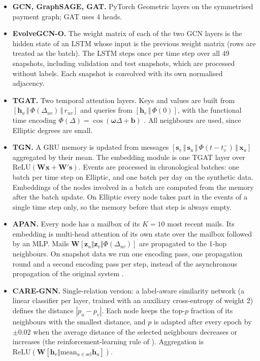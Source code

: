 \begin{itemize}
\item \textbf{GCN, GraphSAGE, GAT.} PyTorch Geometric layers on the symmetrised payment graph; GAT uses 4 heads.
\item \textbf{EvolveGCN-O.} The weight matrix of each of the two GCN layers is the hidden state of an LSTM whose input is the previous weight matrix (rows are treated as the batch). The LSTM steps once per time step over all 49 snapshots, including validation and test snapshots, which are processed without labels. Each snapshot is convolved with its own normalised adjacency.
\item \textbf{TGAT.} Two temporal attention layers. Keys and values are built from $[\mathbf{h}_u\,\Vert\,\Phi(\Delta_{uv})\,\Vert\,r_{uv}]$ and queries from $[\mathbf{h}_v\,\Vert\,\Phi(0)]$, with the functional time encoding $\Phi(\Delta)=\cos(\boldsymbol{\omega}\Delta+\mathbf{b})$ \citep{xu2020tgat}. All neighbours are used, since Elliptic degrees are small.
\item \textbf{TGN.} A GRU memory is updated from messages $[\mathbf{s}_v\,\Vert\,\mathbf{s}_u\,\Vert\,\Phi(t-t^{-}_v)\,\Vert\,\mathbf{x}_u]$ aggregated by their mean. The embedding module is one TGAT layer over $\mathrm{ReLU}(\mathbf{W}\mathbf{x}+\mathbf{W}'\mathbf{s})$. Events are processed in chronological batches: one batch per time step on Elliptic, and one batch per day on the synthetic data. Embeddings of the nodes involved in a batch are computed from the memory after the batch update. On Elliptic every node takes part in the events of a single time step only, so the memory before that step is always empty.
\item \textbf{APAN.} Every node has a mailbox of its $K=10$ most recent mails. Its embedding is multi-head attention of its own state over the mailbox followed by an MLP. Mails $\mathbf{W}[\mathbf{z}_u\Vert\mathbf{z}_v\Vert\Phi(\Delta_{uv})]$ are propagated to the 1-hop neighbours. On snapshot data we run one encoding pass, one propagation round and a second encoding pass per step, instead of the asynchronous propagation of the original system \citep{wang2021apan}.
\item \textbf{CARE-GNN.} Single-relation version: a label-aware similarity network (a linear classifier per layer, trained with an auxiliary cross-entropy of weight 2) defines the distance $|p_u-p_v|$. Each node keeps the top-$p$ fraction of its neighbours with the smallest distance, and $p$ is adapted after every epoch by $\pm0.02$ when the average distance of the selected neighbours decreases or increases (the reinforcement-learning rule of \citealp{dou2020caregnn}). Aggregation is $\mathrm{ReLU}(\mathbf{W}[\mathbf{h}_v\Vert\mathrm{mean}_{u\in\text{sel}}\mathbf{h}_u])$.

\end{itemize}
